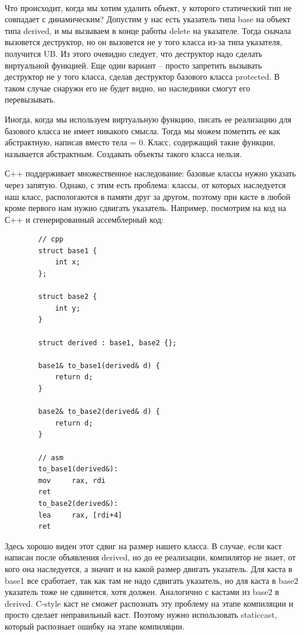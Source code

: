 \documentclass[12pt, a4paper]{article}
\begin{document}
	\\\par Что происходит, когда мы хотим удалить объект, у которого статический тип не совпадает с динамическим? Допустим у нас есть указатель типа base на объект типа derived, и мы вызываем в конце работы delete на указателе. Тогда сначала вызовется деструктор, но он вызовется не у того класса из-за типа указателя, получится UB. Из этого очевидно следует, что деструктор надо сделать виртуальной функцией. Еще один вариант -- просто запретить вызывать деструктор не у того класса, сделав деструктор базового класса protected. В таком случае снаружи его не будет видно, но наследники смогут его перевызывать.
	\\\par Иногда, когда мы используем виртуальную функцию, писать ее реализацию для базового класса не имеет никакого смысла. Тогда мы можем пометить ее как абстрактную, написав вместо тела = 0. Класс, содержащий такие функции, называется абстрактным. Создавать объекты такого класса нельзя.
	\\\par С++ поддерживает множественное наследование: базовые классы нужно указать через запятую. Однако, с этим есть проблема: классы, от которых наследуется наш класс, распологаются в памяти друг за другом, поэтому при касте в любой кроме первого нам нужно сдвигать указатель. Например, посмотрим на код на С++ и сгенерированный ассемблерный код:
	\begin{verbatim}
		// cpp
		struct base1 {
			int x;
		};
		
		struct base2 {
			int y;
		}
		
		struct derived : base1, base2 {};
		
		base1& to_base1(derived& d) {
			return d;
		}
		
		base2& to_base2(derived& d) {
			return d;
		}
		
		// asm
		to_base1(derived&):
		mov     rax, rdi
		ret
		to_base2(derived&):
		lea     rax, [rdi+4]
		ret
	\end{verbatim}
	Здесь хорошо виден этот сдвиг на размер нашего класса. В случае, если каст написан после объявления derived, но до ее реализации, компилятор не знает, от кого она наследуется, а значит и на какой размер двигать указатель. Для каста в base1 все сработает, так как там не надо сдвигать указатель, но для каста в base2 указатель тоже не сдвинется, хотя должен. Аналогично с кастами из base2 в derived. C-style каст не сможет распознать эту проблему на этапе компиляции и просто сделает неправильный каст. Поэтому нужно использовать static\textunderscore cast, который распознает ошибку на этапе компиляции.
\end{document}
